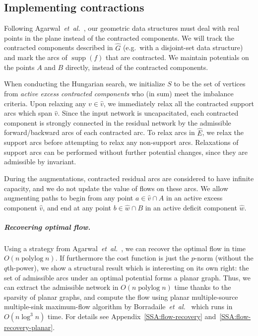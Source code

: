 \documentclass[a4paper,UKenglish]{socg-lipics-v2018}
\makeatletter
\def\etal{\emph{et~al.}}
\def\etal{\textit{et~al.}}
\def\polylog{\mathop{\mathrm{polylog}}}
\def\supp{\operatorname{supp}}
\theoremstyle{plain}
\numberwithin{figure}{section}
\renewcommand{\paragraph}{\subparagraph}
\def\EMPH#1{\textcolor{BrickRed}{{\emph{#1}}}}
\def\n@te#1{\textsf{\boldmath \textbf{$\langle\!\langle$#1$\rangle\!\rangle$}}\leavevmode}
\def\note#1{\textcolor{red}{\n@te{#1}}}
\renewcommand{\note}[1]{} %
\makeatother
\begin{document}
\begin{toappendix}
\subsection{Implementing contractions}
\label{SSA:contraction}

\note{REWRITE}
Following Agarwal~\etal~\cite{AFPVX17}, our geometric data structures must deal
with real points in the plane instead of the contracted components.
We will track the contracted components described in $\hat{G}$ (e.g.\ with a
disjoint-set data structure) and mark the arcs of $\supp(f)$ that are
contracted.
We maintain potentials on the points $A$ and $B$ directly, instead of the
contracted components.

When conducting the Hungarian search, we initialize $S$ to be the set of vertices from
\EMPH{active excess contracted components} who (in sum) meet the imbalance
criteria. \note{unclear}
Upon relaxing any $v \in \hat{v}$, we immediately relax all the contracted
support arcs which span $\hat{v}$.
Since the input network is uncapacitated, each contracted component is
strongly connected in the residual network by the admissible forward/backward
arcs of each contracted arc. \note{unparsable}
To relax arcs in $\hat{E}$, we relax the support arcs before attempting to
relax any non-support arcs.  \note{mention the reason to make support acyclic}
Relaxations of support arcs can be performed without further potential changes,
since they are admissible by invariant.

During the augmentations, contracted residual arcs are considered to have infinite
capacity, and we do not update the value of flows on these arcs.
We allow augmenting paths to begin from any point $a \in \hat{v} \cap A$ in an active
excess component $\hat{v}$, and end at any point $b \in \hat{w} \cap B$ in an active
deficit component $\hat{w}$.

\end{toappendix}

\paragraph{Recovering optimal flow.}
Using a strategy from Agarwal~\etal~\cite{AFPVX17}, we can recover the optimal
flow in time $O(n\polylog n)$.
%
If furthermore the cost function is just the $p$-norm (without the $q$th-power),
we show a structural result which is interesting on its own right:
the set of admissible arcs under an optimal potential forms a planar graph.
Thus, we can extract the admissible network in $O(n\polylog n)$ time thanks
to the sparsity of planar graphs, and compute the flow using planar
multiple-source multiple-sink maximum-flow algorithm by
Borradaile~\etal~\cite{BKMNW17} which runs in $O(n\log^3 n)$ time.
For details see Appendix~\ref{SSA:flow-recovery} and~\ref{SSA:flow-recovery-planar}.
\end{document}
